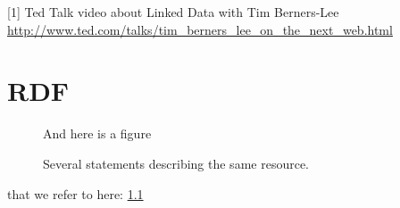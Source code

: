 \documentclass[a4paper,11pt]{kth-mag}
\begin{document}
[1] Ted Talk video about Linked Data with Tim Berners-Lee \url{http://www.ted.com/talks/tim_berners_lee_on_the_next_web.html}


\appendix
\addappheadtotoc
\chapter{RDF}\label{appA}

\begin{figure}[ht]
\begin{center}
And here is a figure
\caption{\small{Several statements describing the same resource.}}\label{RDF_4}
\end{center}
\end{figure}

that we refer to here: \ref{RDF_4}
\end{document}
